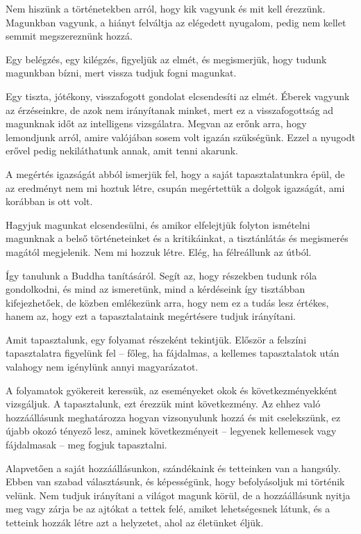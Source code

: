 Nem hiszünk a történetekben arról, hogy kik vagyunk és mit kell
érezzünk. Magunkban vagyunk, a hiányt felváltja az elégedett nyugalom,
pedig nem kellet semmit megszereznünk hozzá.

Egy belégzés, egy kilégzés, figyeljük az elmét, és megismerjük, hogy
tudunk magunkban bízni, mert vissza tudjuk fogni magunkat.

Egy tiszta, jótékony, visszafogott gondolat elcsendesíti az elmét.
Éberek vagyunk az érzéseinkre, de azok nem irányítanak minket, mert ez a
visszafogottság ad magunknak időt az intelligens vizsgálatra. Megvan az
erőnk arra, hogy lemondjunk arról, amire valójában sosem volt igazán
szükségünk. Ezzel a nyugodt erővel pedig nekiláthatunk annak, amit tenni
akarunk.

A megértés igazságát abból ismerjük fel, hogy a saját tapasztalatunkra
épül, de az eredményt nem mi hoztuk létre, csupán megértettük a dolgok
igazságát, ami korábban is ott volt.

Hagyjuk magunkat elcsendesülni, és amikor elfelejtjük folyton ismételni
magunknak a belső történeteinket és a kritikáinkat, a tisztánlátás és
megismerés magától megjelenik. Nem mi hozzuk létre. Elég, ha félreállunk
az útból.

Így tanulunk a Buddha tanításáról. Segít az, hogy részekben tudunk róla
gondolkodni, és mind az ismeretünk, mind a kérdéseink így tisztábban
kifejezhetőek, de közben emlékezünk arra, hogy nem ez a tudás lesz
értékes, hanem az, hogy ezt a tapasztalataink megértésere tudjuk
irányítani.

Amit tapasztalunk, egy folyamat részeként tekintjük. Először a felszíni
tapasztalatra figyelünk fel -- főleg, ha fájdalmas, a kellemes
tapasztalatok után valahogy nem igénylünk annyi magyarázatot.

A folyamatok gyökereit keressük, az eseményeket okok és
következményekként vizsgáljuk. A tapasztalunk, ezt érezzük mint
következmény. Az ehhez való hozzáállásunk meghatározza hogyan
vizsonyulunk hozzá és mit cselekszünk, ez újabb okozó tényező lesz,
aminek következményeit -- legyenek kellemesek vagy fájdalmasak -- meg
fogjuk tapasztalni.

Alapvetően a saját hozzáállásunkon, szándékaink és tetteinken van a
hangsúly. Ebben van szabad választásunk, és képességünk, hogy
befolyásoljuk mi történik velünk. Nem tudjuk irányítani a világot magunk
körül, de a hozzáállásunk nyitja meg vagy zárja be az ajtókat a tettek
felé, amiket lehetségesnek látunk, és a tetteink hozzák létre azt a
helyzetet, ahol az életünket éljük.

